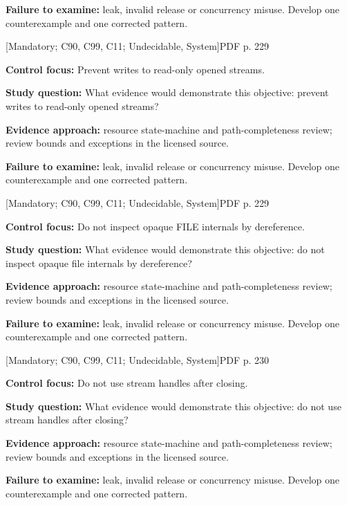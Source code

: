 \documentclass[10pt,letterpaper]{article}
\begin{document}
\textbf{Failure to examine:} leak, invalid release or concurrency misuse. Develop one counterexample and one corrected pattern.\par
\smallskip
{}
 \textsf{\footnotesize [Mandatory; C90, C99, C11; Undecidable, System]}\hfill{\footnotesize PDF p. 229}\par
\textbf{Control focus:} Prevent writes to read-only opened streams.\par
\textbf{Study question:} What evidence would demonstrate this objective: prevent writes to read-only opened streams?\par
\textbf{Evidence approach:} resource state-machine and path-completeness review; review bounds and exceptions in the licensed source.\par
\textbf{Failure to examine:} leak, invalid release or concurrency misuse. Develop one counterexample and one corrected pattern.\par
\smallskip
{}
 \textsf{\footnotesize [Mandatory; C90, C99, C11; Undecidable, System]}\hfill{\footnotesize PDF p. 229}\par
\textbf{Control focus:} Do not inspect opaque FILE internals by dereference.\par
\textbf{Study question:} What evidence would demonstrate this objective: do not inspect opaque file internals by dereference?\par
\textbf{Evidence approach:} resource state-machine and path-completeness review; review bounds and exceptions in the licensed source.\par
\textbf{Failure to examine:} leak, invalid release or concurrency misuse. Develop one counterexample and one corrected pattern.\par
\smallskip
{}
 \textsf{\footnotesize [Mandatory; C90, C99, C11; Undecidable, System]}\hfill{\footnotesize PDF p. 230}\par
\textbf{Control focus:} Do not use stream handles after closing.\par
\textbf{Study question:} What evidence would demonstrate this objective: do not use stream handles after closing?\par
\textbf{Evidence approach:} resource state-machine and path-completeness review; review bounds and exceptions in the licensed source.\par
\textbf{Failure to examine:} leak, invalid release or concurrency misuse. Develop one counterexample and one corrected pattern.\par
\end{document}
